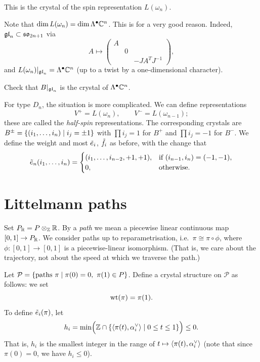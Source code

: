 \begin{claim}
This is the crystal of the spin representation $L(\omega_n)$.
\end{claim}

\begin{remark}
Note that $\dim L(\omega_n) = \dim \Lambda^\bullet\mathbb{C}^n$. This is for a very good
reason. Indeed, $\mathfrak{gl}_n \subset \mathfrak{so}_{2n+1}$ via
\[
  A \mapsto \begin{pmatrix} A & & \\ & 0 & \\ & & -JA^TJ^{-1} \end{pmatrix},
\]
and $L(\omega_n)|_{\mathfrak{gl}_n} = \Lambda^\bullet\mathbb{C}^n$ (up to a twist by a
one-dimensional character).
\end{remark}

\begin{exercise}
Check that $B|_{\mathfrak{gl}_n}$ is the crystal of $\Lambda^\bullet\mathbb{C}^n$.
\end{exercise}

For type $D_n$, the situation is more complicated. We can define
representations
\[
  V^+ = L(\omega_n), \qquad V^- = L(\omega_{n-1});
\]
these are called the \emph{half-spin} representations. The corresponding
crystals are $B^\pm = \{(i_1, \dots, i_n) \mid i_j = \pm 1\}$ with
$\prod i_j = 1$ for $B^+$ and $\prod i_j = -1$ for $B^-$. We define the weight
and most $\tilde{e}_i$, $\tilde{f}_i$ as before, with the change that
\[
  \tilde{e}_n(i_1, \dots, i_n) = \begin{cases}
    (i_1, \dots, i_{n-2}, +1, +1), & \text{if } (i_{n-1}, i_n) = (-1, -1),\\
    0, & \text{otherwise}.
  \end{cases}
\]


\section{Littelmann paths}

Set $P_{\mathbb{R}} = P \otimes_{\mathbb{Z}} \mathbb{R}$. By a \emph{path} we mean a piecewise linear
continuous map $[0, 1] \to P_{\mathbb{R}}$. We consider paths up to
reparametrisation, i.e.\ $\pi \cong \pi \circ \phi$, where
$\phi\colon [0, 1] \to [0, 1]$ is a piecewise-linear isomorphism. (That is, we
care about the trajectory, not about the speed at which we traverse the path.)

Let $\mathcal{P} = \{\text{paths } \pi \mid \pi(0) = 0,\ \pi(1) \in P\}$. Define
a crystal structure on $\mathcal{P}$ as follows: we set
\[
  \operatorname{wt}(\pi) = \pi(1).
\]
To define $\tilde{e}_i(\pi)$, let
\[
  h_i = \min\Bigl(\mathbb{Z} \cap \{\langle \pi(t),\alpha_i^{\vee}\rangle \mid 0 \leq t \leq 1\}\Bigr) \leq 0.
\]
That is, $h_i$ is the smallest integer in the range of
$t \mapsto \langle \pi(t),\alpha_i^{\vee}\rangle$ (note that since $\pi(0) = 0$, we have
$h_i \leq 0$).

